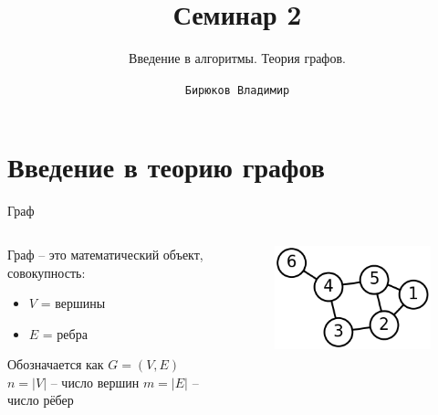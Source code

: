 \documentclass[newPxFont]{beamer}
\title{Семинар 2}
\subtitle{Введение в алгоритмы. Теория графов.}
\author{\texttt{Бирюков Владимир}}
\institute{МФТИ}
\begin{document}
%
%

\maketitle


%
%

\section{Введение в теорию графов}



\begin{frame}{Граф}
\begin{columns}
\begin{column}{.48\linewidth}
Граф -- это математический объект, совокупность:
\begin{itemize}
\item $V$ = вершины
\item $E$ = ребра
\end{itemize}
Обозначается как $G = (V, E)$ \\
$n = |V|$ -- число вершин
$m = |E|$ -- число рёбер
\end{column}
\begin{column}{.48\linewidth}
		\begin{figure}
		\centerline{\includegraphics[width=1.0\linewidth]{images/graph1.png}}
		\end{figure}
	\end{column}
\end{columns}
\end{frame}
\end{document}
